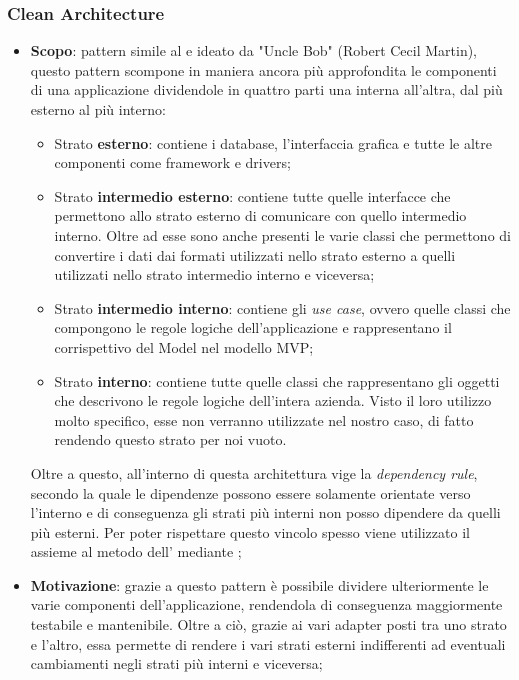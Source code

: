 \subsubsection{Clean Architecture}
\begin{itemize}
	\item \textbf{Scopo}: pattern simile al  e ideato da "Uncle Bob" (Robert Cecil Martin), questo pattern scompone in maniera ancora più approfondita le componenti di una applicazione dividendole in quattro parti una interna all'altra, dal più esterno al più interno:
	\begin{itemize}
	  	\item Strato \textbf{esterno}: contiene i database, l'interfaccia grafica e tutte le altre componenti come framework e drivers;
	  	\item Strato \textbf{intermedio esterno}: contiene tutte quelle interfacce che permettono allo strato esterno di comunicare con quello intermedio interno. Oltre ad esse sono anche presenti le varie classi che permettono di convertire i dati dai formati utilizzati nello strato esterno a quelli utilizzati nello strato intermedio interno e viceversa;
	  	\item Strato \textbf{intermedio interno}: contiene gli \textit{use case}, ovvero quelle classi che compongono le regole logiche dell'applicazione e rappresentano il corrispettivo del Model nel modello MVP;
	  	\item Strato \textbf{interno}: contiene tutte quelle classi che rappresentano gli oggetti che descrivono le regole logiche dell'intera azienda. Visto il loro utilizzo molto specifico, esse non verranno utilizzate nel nostro caso, di fatto rendendo questo strato per noi vuoto.
	\end{itemize}
	Oltre a questo, all'interno di questa architettura vige la \textit{dependency rule}, secondo la quale le dipendenze possono essere solamente orientate verso l'interno e di conseguenza gli strati più interni non posso dipendere da quelli più esterni. Per poter rispettare questo vincolo spesso viene utilizzato il  assieme al metodo dell' mediante ;
	\item \textbf{Motivazione}: grazie a questo pattern è possibile dividere ulteriormente le varie componenti dell'applicazione, rendendola di conseguenza maggiormente testabile e mantenibile. Oltre a ciò, grazie ai vari adapter posti tra uno strato e l'altro, essa permette di rendere i vari strati esterni indifferenti ad eventuali cambiamenti negli strati più interni e viceversa;

\end{itemize}

